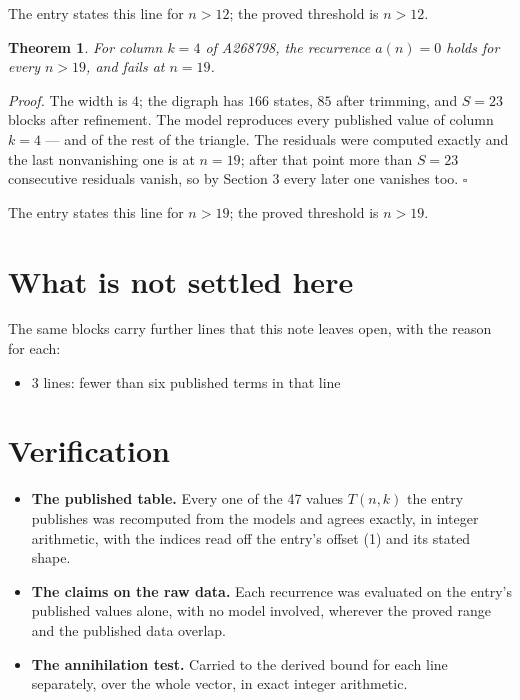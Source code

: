 \documentclass[11pt]{article}
\newtheorem{theorem}{Theorem}
\theoremstyle{definition}
\begin{document}
The entry states this line for $n > 12$; the proved threshold is $n > 12$.

\begin{theorem} For column $k = 4$ of A268798, the recurrence $a(n) = 0$ holds for every $n > 19$, and fails at $n = 19$.\end{theorem}

{\itshape Proof.} The width is $4$; the digraph has $166$ states, $85$ after trimming, and $S = 23$ blocks after refinement. The model reproduces every published value of column $k = 4$ --- and of the rest of the triangle. The residuals were computed exactly and the last nonvanishing one is at $n = 19$; after that point more than $S = 23$ consecutive residuals vanish, so by Section 3 every later one vanishes too. $\square$

The entry states this line for $n > 19$; the proved threshold is $n > 19$.

\section{What is not settled here}

The same blocks carry further lines that this note leaves open, with the reason for each:

\begin{itemize}

\item 3 lines: fewer than six published terms in that line

\end{itemize}

\section{Verification}

\begin{itemize}

\item {\bfseries The published table.} Every one of the 47 values $T(n,k)$ the entry publishes was recomputed from the models and agrees exactly, in integer arithmetic, with the indices read off the entry's offset (1) and its stated shape.

\item {\bfseries The claims on the raw data.} Each recurrence was evaluated on the entry's published values alone, with no model involved, wherever the proved range and the published data overlap.

\item {\bfseries The annihilation test.} Carried to the derived bound for each line separately, over the whole vector, in exact integer arithmetic.

\end{itemize}
\end{document}
